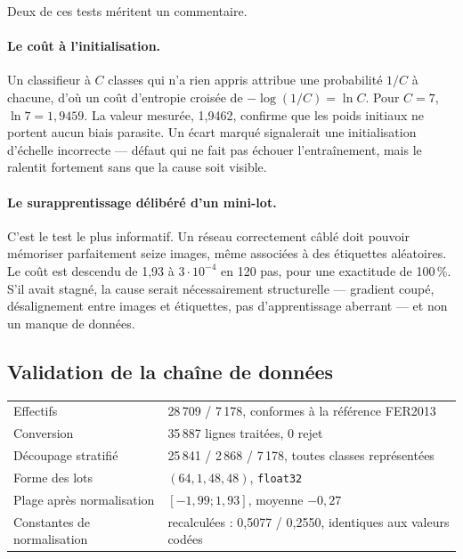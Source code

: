 \documentclass[11pt,a4paper]{article}
\newcommand{\code}[1]{\texttt{\small #1}}
\begin{document}
Deux de ces tests méritent un commentaire.

\paragraph{Le coût à l'initialisation.}
Un classifieur à $C$ classes qui n'a rien appris attribue une probabilité $1/C$ à
chacune, d'où un coût d'entropie croisée de $-\log(1/C) = \ln C$. Pour $C=7$,
$\ln 7 = 1{,}9459$. La valeur mesurée, 1{,}9462, confirme que les poids initiaux
ne portent aucun biais parasite. Un écart marqué signalerait une initialisation
d'échelle incorrecte --- défaut qui ne fait pas échouer l'entraînement, mais le
ralentit fortement sans que la cause soit visible.

\paragraph{Le surapprentissage délibéré d'un mini-lot.}
C'est le test le plus informatif. Un réseau correctement câblé doit pouvoir
mémoriser parfaitement seize images, même associées à des étiquettes aléatoires.
Le coût est descendu de 1{,}93 à $3\cdot10^{-4}$ en 120 pas, pour une exactitude
de 100\,\%. S'il avait stagné, la cause serait nécessairement structurelle ---
gradient coupé, désalignement entre images et étiquettes, pas d'apprentissage
aberrant --- et non un manque de données.

\subsection{Validation de la chaîne de données}

\begin{center}
\small
\begin{tabularx}{\textwidth}{lX}
\toprule
Effectifs & 28\,709 / 7\,178, conformes à la référence FER2013 \\
Conversion & 35\,887 lignes traitées, 0 rejet \\
Découpage stratifié & 25\,841 / 2\,868 / 7\,178, toutes classes représentées \\
Forme des lots & $(64, 1, 48, 48)$, \code{float32} \\
Plage après normalisation & $[-1{,}99 ; 1{,}93]$, moyenne $-0{,}27$ \\
Constantes de normalisation & recalculées : 0{,}5077 / 0{,}2550, identiques aux valeurs codées \\
\bottomrule
\end{tabularx}
\end{center}
\end{document}
